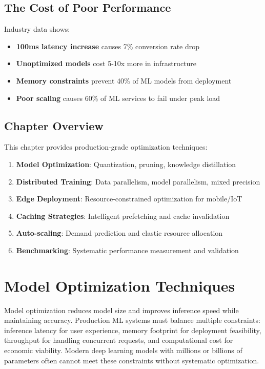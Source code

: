 \subsection{The Cost of Poor Performance}

Industry data shows:
\begin{itemize}
    \item \textbf{100ms latency increase} causes 7\% conversion rate drop
    \item \textbf{Unoptimized models} cost 5-10x more in infrastructure
    \item \textbf{Memory constraints} prevent 40\% of ML models from deployment
    \item \textbf{Poor scaling} causes 60\% of ML services to fail under peak load
\end{itemize}

\subsection{Chapter Overview}

This chapter provides production-grade optimization techniques:

\begin{enumerate}
    \item \textbf{Model Optimization}: Quantization, pruning, knowledge distillation
    \item \textbf{Distributed Training}: Data parallelism, model parallelism, mixed precision
    \item \textbf{Edge Deployment}: Resource-constrained optimization for mobile/IoT
    \item \textbf{Caching Strategies}: Intelligent prefetching and cache invalidation
    \item \textbf{Auto-scaling}: Demand prediction and elastic resource allocation
    \item \textbf{Benchmarking}: Systematic performance measurement and validation
\end{enumerate}

\section{Model Optimization Techniques}

Model optimization reduces model size and improves inference speed while maintaining accuracy. Production ML systems must balance multiple constraints: inference latency for user experience, memory footprint for deployment feasibility, throughput for handling concurrent requests, and computational cost for economic viability. Modern deep learning models with millions or billions of parameters often cannot meet these constraints without systematic optimization.

